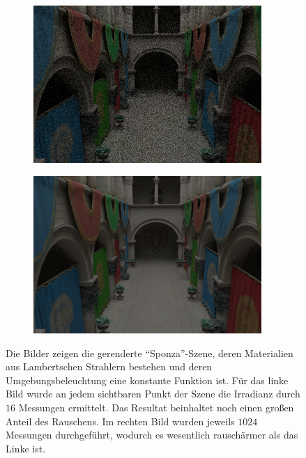 		\begin{figure}[h]
			\begin{subfigure}[b]{0.5\textwidth}
				\center
				\includegraphics[width=0.95\textwidth]{pic/sponza-noise-high.png}
			\end{subfigure}
			\begin{subfigure}[b]{0.5\textwidth}
				\center
				\includegraphics[width=0.95\textwidth]{pic/sponza-noise-low.png}
			\end{subfigure}
			\caption{Die Bilder zeigen die gerenderte \enquote{Sponza}-Szene, deren Materialien aus Lambertschen Strahlern bestehen und deren Umgebungsbeleuchtung eine konstante Funktion ist. Für das linke Bild wurde an jedem sichtbaren Punkt der Szene die Irradianz durch $16$ Messungen ermittelt. Das Resultat beinhaltet noch einen großen Anteil des Rauschens. Im rechten Bild wurden jeweils $1024$ Messungen durchgeführt, wodurch es wesentlich rauschärmer als das Linke ist.}
			\label{fig:sponza-noise}
		\end{figure}


